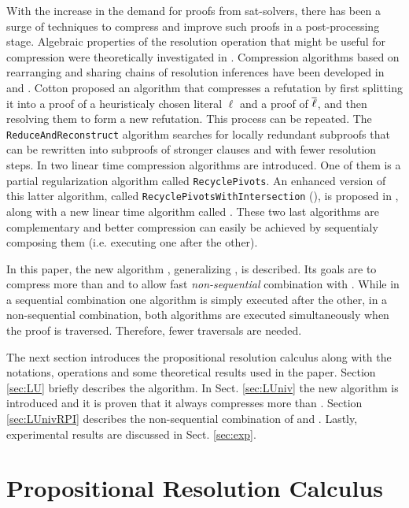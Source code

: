 \documentclass{llncs}
\begin{document}
With the increase in the demand for proofs from sat-solvers, there has been a surge of techniques to
compress and improve such proofs in a post-processing stage.  Algebraic properties of the resolution
operation that might be useful for compression were theoretically investigated in \cite{bwp10}. Compression algorithms based on rearranging and sharing chains of resolution inferences have been developed in \cite{Amjad07} and \cite{Sinz}.  Cotton \cite{CottonSplit}
proposed an algorithm that compresses a refutation by first splitting it into a proof of a
heuristicaly chosen literal $\ell$ and a proof of $\overline{\ell}$, and then resolving them to form a
new refutation. This process can be repeated.  The \texttt{ReduceAndReconstruct} algorithm
\cite{RedRec} searches for locally redundant subproofs that can be rewritten into subproofs of
stronger clauses and with fewer resolution steps. In \cite{RP08} two linear time compression
algorithms are introduced. One of them is a partial regularization algorithm called
\texttt{RecyclePivots}.  An enhanced version of this latter algorithm, called
\texttt{RecyclePivotsWithIntersection} ({\RPI}), is proposed in \cite{LURPI}, along with a new
linear time algorithm called {\LowerUnits}.  These two last algorithms are complementary and better
compression can easily be achieved by sequentialy composing them (i.e. executing one after the
other).

In this paper, the new algorithm {\LowerUnivalents}, generalizing {\LowerUnits}, is described. Its
goals are to compress more than {\LowerUnits} and to allow fast \emph{non-sequential}  combination
with {\RPI}. While in a sequential combination one algorithm is simply executed after the other, in
a non-sequential combination, both algorithms are executed simultaneously when the proof is
traversed. Therefore, fewer traversals are needed.

The next section introduces the propositional resolution calculus along with the notations,
operations and some theoretical results used in the paper. Section \ref{sec:LU} briefly describes
the {\LowerUnits} algorithm. In Sect. \ref{sec:LUniv} the new algorithm {\LowerUnivalents} is
introduced and it is proven that it always compresses more than {\LowerUnits}. Section
\ref{sec:LUnivRPI} describes the non-sequential combination of {\LowerUnivalents} and {\RPI}.
Lastly, experimental results are discussed in Sect. \ref{sec:exp}.



\section{Propositional Resolution Calculus}
\end{document}
